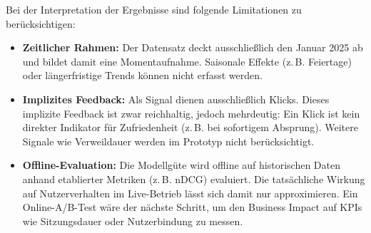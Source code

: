 Bei der Interpretation der Ergebnisse sind folgende Limitationen zu berücksichtigen:
\begin{itemize}
    \item \textbf{Zeitlicher Rahmen:} Der Datensatz deckt ausschließlich den Januar 2025 ab und bildet damit 
    eine Momentaufnahme. Saisonale Effekte (z.\,B. Feiertage) oder längerfristige Trends können nicht erfasst werden.
    \item \textbf{Implizites Feedback:} Als Signal dienen ausschließlich Klicks. Dieses implizite Feedback ist 
    zwar reichhaltig, jedoch mehrdeutig: Ein Klick ist kein direkter Indikator für Zufriedenheit 
    (z.\,B. bei sofortigem Absprung). Weitere Signale wie Verweildauer werden im Prototyp nicht berücksichtigt.
    \item \textbf{Offline-Evaluation:} Die Modellgüte wird offline auf historischen Daten anhand etablierter 
    Metriken (z.\,B. \ac{nDCG}) evaluiert. Die tatsächliche Wirkung auf Nutzerverhalten im 
    Live-Betrieb lässt sich damit nur approximieren. Ein Online-A/B-Test wäre der nächste Schritt, 
    um den Business Impact auf KPIs wie Sitzungsdauer oder Nutzerbindung zu messen.
\end{itemize}